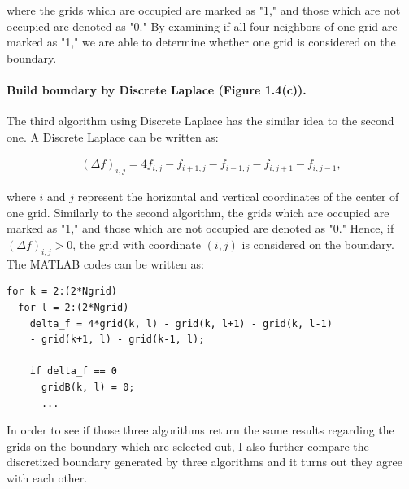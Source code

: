 \documentclass[letterpaper]{article}
\numberwithin{equation}{section} %
\numberwithin{figure}{section} %
\numberwithin{table}{section} %
\begin{document}
\noindent
where the grids which are occupied are marked as "1," and those which are not occupied are denoted as "0." By examining if all four neighbors of one grid are marked as "1," we are able to determine whether one grid is considered on the boundary.


\paragraph{Build boundary by Discrete Laplace (Figure 1.4(c)).}
The third algorithm using Discrete Laplace has the similar idea to the second one. A Discrete Laplace can be written as:

\begin{align} 
(\Delta f)_{i,j} = 4f_{i,j}-f_{i+1,j}- f_{i-1,j}-f_{i,j+1}-f_{i,j-1},
\end{align}

\noindent
where $i$ and $j$ represent the horizontal and vertical coordinates of the center of one grid. Similarly to the second algorithm, the grids which are occupied are marked as "1," and those which are not occupied are denoted as "0." Hence, if $(\Delta f)_{i,j}>0$, the grid with coordinate $(i,j)$ is considered on the boundary. The MATLAB codes can be written as:

\begin{lstlisting}
for k = 2:(2*Ngrid)
  for l = 2:(2*Ngrid)
    delta_f = 4*grid(k, l) - grid(k, l+1) - grid(k, l-1) 
    - grid(k+1, l) - grid(k-1, l);

    if delta_f == 0  
      gridB(k, l) = 0; 
      ...
\end{lstlisting}

In order to see if those three algorithms return the same results regarding the grids on the boundary which are selected out, I also further compare the discretized boundary generated by three algorithms and it turns out they agree with each other.
\end{document}

